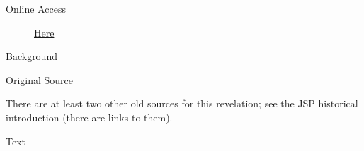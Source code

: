			\begin{description}
				\item[Online Access] \href{https://www.josephsmithpapers.org/paper-summary/revelation-27-july-1842/1}{Here}
			\end{description}
			
			\begin{description}
				\item[Background]
			\end{description}
			
			
			\begin{description}
				\item[Original Source]
			\end{description}
			
				There are at least two other old sources for this revelation; see the JSP historical introduction (there are links to them).
			
			
			\begin{description}
				\item[Text]
			\end{description}
			
					
